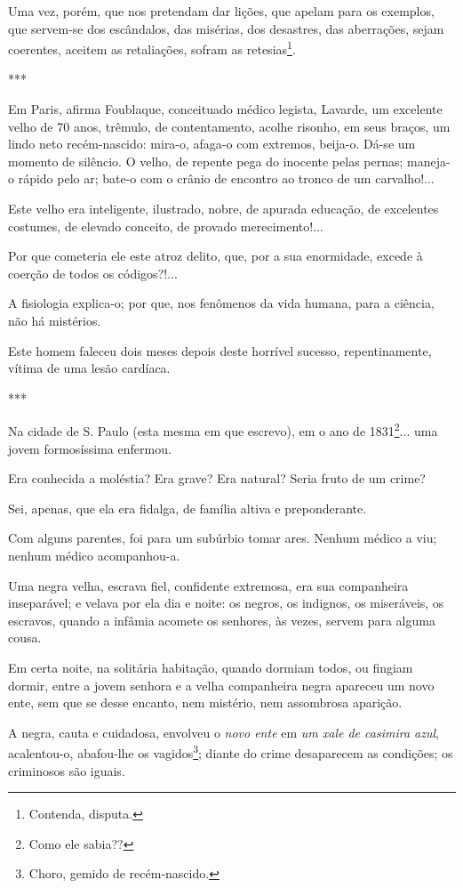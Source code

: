 Uma vez, porém, que nos pretendam dar lições, que apelam para os
exemplos, que servem-se dos escândalos, das misérias, dos desastres, das
aberrações, sejam coerentes, aceitem as retaliações, sofram as
retesias\footnote{Contenda, disputa.}.

***

Em Paris, afirma Foublaque, conceituado médico legista, Lavarde, um
excelente velho de 70 anos, trêmulo, de contentamento, acolhe risonho,
em seus braços, um lindo neto recém-nascido: mira-o, afaga-o com
extremos, beija-o. Dá-se um momento de silêncio. O velho, de repente
pega do inocente pelas pernas; maneja-o rápido pelo ar; bate-o com o
crânio de encontro ao tronco de um carvalho!...

Este velho era inteligente, ilustrado, nobre, de apurada educação, de
excelentes costumes, de elevado conceito, de provado merecimento!...

Por que cometeria ele este atroz delito, que, por a sua enormidade,
excede à coerção de todos os códigos?!...

A fisiologia explica-o; por que, nos fenômenos da vida humana, para a
ciência, não há mistérios.

Este homem faleceu dois meses depois deste horrível sucesso,
repentinamente, vítima de uma lesão cardíaca.

***

Na cidade de S. Paulo (esta mesma em que escrevo), em o ano de
1831\footnote{Como ele sabia??}... uma jovem formosíssima enfermou.

Era conhecida a moléstia? Era grave? Era natural? Seria fruto de um
crime?

Sei, apenas, que ela era fidalga, de família altiva e preponderante.

Com alguns parentes, foi para um subúrbio tomar ares. Nenhum médico a
viu; nenhum médico acompanhou-a.

Uma negra velha, escrava fiel, confidente extremosa, era sua companheira
inseparável; e velava por ela dia e noite: os negros, os indignos, os
miseráveis, os escravos, quando a infâmia acomete os senhores, às vezes,
servem para alguma cousa.

Em certa noite, na solitária habitação, quando dormiam todos, ou fingiam
dormir, entre a jovem senhora e a velha companheira negra apareceu um
novo ente, sem que se desse encanto, nem mistério, nem assombrosa
aparição.

A negra, cauta e cuidadosa, envolveu o \emph{novo ente} em \emph{um xale
de casimira azul}, acalentou-o, abafou-lhe os vagidos\footnote{Choro,
  gemido de recém-nascido.}; diante do crime desaparecem as condições;
os criminosos são iguais.

